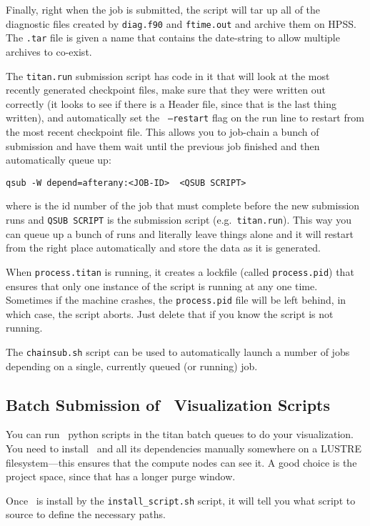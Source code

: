 Finally, right when the job is submitted, the script will tar up all
of the diagnostic files created by {\tt diag.f90} and {\tt ftime.out}
and archive them on HPSS.  The {\tt .tar} file is given a name that
contains the date-string to allow multiple archives to co-exist.

The {\tt titan.run} submission script has code in it that will look
at the most recently generated checkpoint files, make sure that they
were written out correctly (it looks to see if there is a Header file,
since that is the last thing written), and automatically set the {\tt
  --restart} flag on the run line to restart from the most recent
checkpoint file.  This allows you to job-chain a bunch of submission
and have them wait until the previous job finished and then
automatically queue up:
\begin{verbatim}
qsub -W depend=afterany:<JOB-ID>  <QSUB SCRIPT>
\end{verbatim}
where {\tt <JOB-ID>} is the id number of the job that must complete
before the new submission runs and {\tt QSUB SCRIPT} is the submission
script (e.g.\ {\tt titan.run}).
This way you can queue up a bunch of runs and literally leave things
alone and it will restart from the right place automatically and store
the data as it is generated.

When {\tt process.titan} is running, it creates a lockfile (called
{\tt process.pid}) that ensures that only one instance of the script
is running at any one time.  Sometimes if the machine crashes, the
{\tt process.pid} file will be left behind, in which case, the script
aborts.  Just delete that if you know the script is not running.

The {\tt chainsub.sh} script can be used to automatically launch a number
of jobs depending on a single, currently queued (or running) job.

\subsection{Batch Submission of \yt\ Visualization Scripts}

You can run \yt\ python scripts in the titan batch queues
to do your visualization.  You need to install \yt\ and all its dependencies
manually somewhere on a LUSTRE filesystem---this ensures that the compute
nodes can see it.  A good choice is the project space, since that has
a longer purge window.

Once \yt\ is install by the {\tt install\_script.sh} script, it will tell
you what script to source to define the necessary paths.

